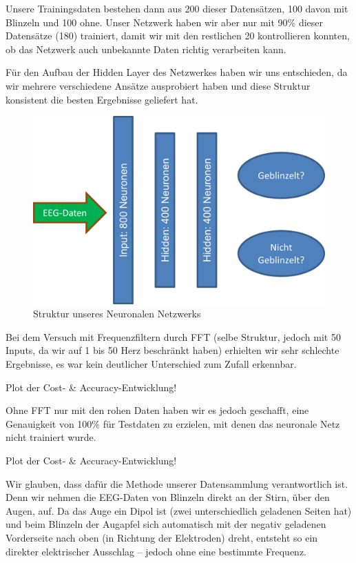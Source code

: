 \documentclass{scrartcl}
\begin{document}
	Unsere Trainingsdaten bestehen dann aus 200 dieser Datensätzen, 100 davon mit Blinzeln und 100 ohne. Unser Netzwerk haben wir aber nur mit 90\% dieser Datensätze (180) trainiert, damit wir mit den restlichen 20 kontrollieren konnten, ob das Netzwerk auch  unbekannte Daten richtig verarbeiten kann.

	Für den Aufbau der Hidden Layer des Netzwerkes haben wir uns entschieden, da wir mehrere verschiedene Ansätze ausprobiert haben und diese Struktur konsistent die besten Ergebnisse geliefert hat.

	\begin{figure}[h]
		\includegraphics[width=\textwidth]{pictures/netzwerk-struktur.png}
		\caption{Struktur unseres Neuronalen Netzwerks}
	\end{figure}

	Bei dem Versuch mit Frequenzfiltern durch FFT (selbe Struktur, jedoch mit 50 Inputs, da wir auf 1 bis 50 Herz beschränkt haben) erhielten wir sehr schlechte Ergebnisse, es war kein deutlicher Unterschied zum Zufall erkennbar.

	Plot der Cost- \& Accuracy-Entwicklung!

	Ohne FFT nur mit den rohen Daten haben wir es jedoch geschafft, eine Genauigkeit von 100\% für Testdaten zu erzielen, mit denen das neuronale Netz nicht trainiert wurde.

	Plot der Cost- \& Accuracy-Entwicklung!

	Wir glauben, dass dafür die Methode unserer Datensammlung verantwortlich ist. Denn wir nehmen die EEG-Daten von Blinzeln direkt an der Stirn, über den Augen, auf. Da das Auge ein Dipol ist (zwei unterschiedlich geladenen Seiten hat) und beim Blinzeln der Augapfel sich automatisch mit der negativ geladenen Vorderseite nach oben (in Richtung der Elektroden) dreht, entsteht so ein direkter elektrischer Ausschlag – jedoch ohne eine bestimmte Frequenz.
	
\end{document}
